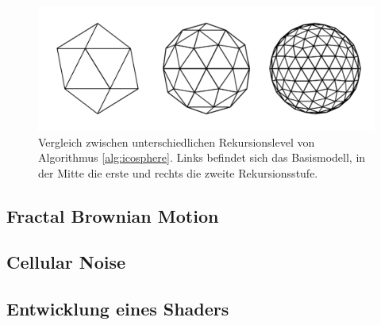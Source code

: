 \begin{figure}
  \caption{Vergleich zwischen unterschiedlichen Rekursionslevel von Algorithmus \ref{alg:icosphere}. Links befindet sich das Basismodell, in der Mitte die erste und rechts die zweite Rekursionsstufe.}
  \label{fig:icosphere-levels}
  \includegraphics[width=\columnwidth]{icosphere-algorithm}
  \Description[]{}
\end{figure}

\subsection{Fractal Brownian Motion}
\subsection{Cellular Noise}
\subsection{Entwicklung eines Shaders}
